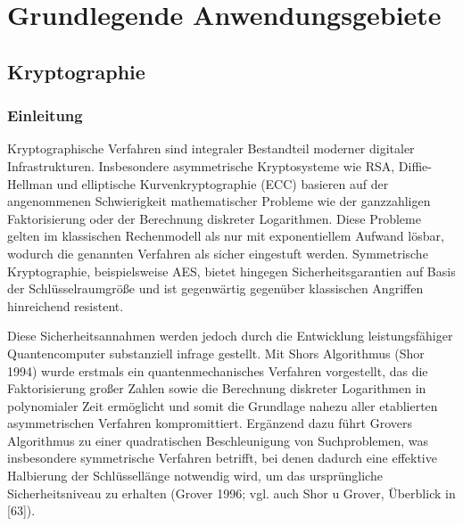 \chapter{Grundlegende Anwendungsgebiete}
\label{trends} %



\section{Kryptographie}
\subsection{Einleitung}

Kryptographische Verfahren sind integraler Bestandteil moderner digitaler Infrastrukturen. Insbesondere asymmetrische Kryptosysteme wie RSA, Diffie-Hellman und elliptische Kurvenkryptographie (ECC) basieren auf der angenommenen Schwierigkeit mathematischer Probleme wie der ganzzahligen Faktorisierung oder der Berechnung diskreter Logarithmen. Diese Probleme gelten im klassischen Rechenmodell als nur mit exponentiellem Aufwand lösbar, wodurch die genannten Verfahren als sicher eingestuft werden. Symmetrische Kryptographie, beispielsweise AES, bietet hingegen Sicherheitsgarantien auf Basis der Schlüsselraumgröße und ist gegenwärtig gegenüber klassischen Angriffen hinreichend resistent.

Diese Sicherheitsannahmen werden jedoch durch die Entwicklung leistungsfähiger Quantencomputer substanziell infrage gestellt. Mit Shors Algorithmus (Shor 1994) wurde erstmals ein quantenmechanisches Verfahren vorgestellt, das die Faktorisierung großer Zahlen sowie die Berechnung diskreter Logarithmen in polynomialer Zeit ermöglicht und somit die Grundlage nahezu aller etablierten asymmetrischen Verfahren kompromittiert. Ergänzend dazu führt Grovers Algorithmus zu einer quadratischen Beschleunigung von Suchproblemen, was insbesondere symmetrische Verfahren betrifft, bei denen dadurch eine effektive Halbierung der Schlüssellänge notwendig wird, um das ursprüngliche Sicherheitsniveau zu erhalten (Grover 1996; vgl. auch Shor u Grover, Überblick in [63]).

